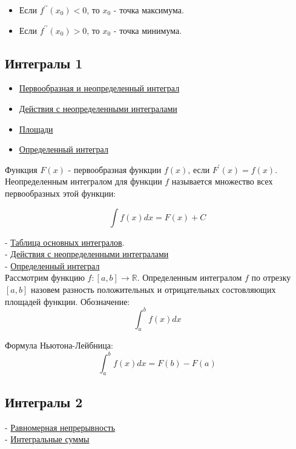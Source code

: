 \documentclass{article}
\begin{document}
\begin{itemize}
	\item Если $f^{\prime \prime}(x_0) < 0$, то $x_0$ - точка максимума.
	\item Если $f^{\prime \prime}(x_0) > 0$, то $x_0$ - точка минимума.
\end{itemize}

\subsection{Интегралы 1}

\begin{itemize}
	\item \href{https://stepik.org/lesson/28376/step/1}{Первообразная и неопределенный интеграл}
	\item \href{https://stepik.org/lesson/28377/step/1}{Действия с неопределенными интегралами}
	\item \href{https://stepik.org/lesson/28378/step/2}{Площади}
	\item \href{https://stepik.org/lesson/28379/step/1}{Определенный интеграл}
\end{itemize}

Функция $F(x)$ - первообразная функции $f(x)$, если $F^{\prime}(x) = f(x)$. \\

Неопределенным интегралом для функции $f$ называется множество всех первообразных этой функции:

$$ \int f(x) dx = F(x) + C $$

- \href{https://stepik.org/lesson/28376/step/3}{Таблица основных интегралов}. \\
- \href{https://stepik.org/lesson/28377/step/2}{Действия с неопределенными интегралами} \\
- \href{https://stepik.org/lesson/28379/step/2}{Определенный интеграл} \\

Рассмотрим функцию $f : [a, b] \to \mathbb{R}$. Определенным интегралом $f$ по отрезку $[a, b]$ назовем разность положительных и отрицательных состовляющих площадей функции. Обозначение: $$ \int_{a}^{b} f(x) dx $$

Формула Ньютона-Лейбница: $$ \int_{a}^{b} f(x) dx = F(b) - F(a) $$

\subsection{Интегралы 2}

- \href{https://stepik.org/lesson/35886/step/2}{Равномерная непрерывность} \\
- \href{https://stepik.org/lesson/28384/step/1}{Интегральные суммы}
\end{document}
